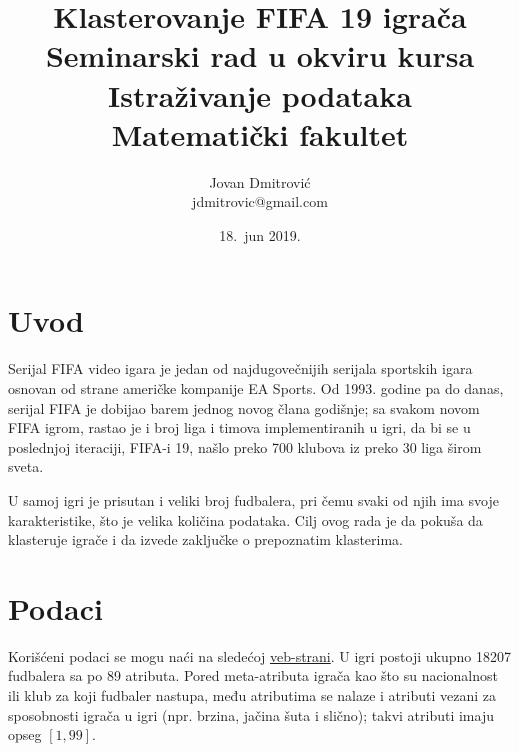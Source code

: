 \documentclass[a4paper]{article}
\begin{document}
\title{Klasterovanje FIFA 19 igrača\\ \small{Seminarski rad u okviru kursa\\Istraživanje podataka\\ Matematički fakultet}}

\author{Jovan Dmitrović\\ jdmitrovic@gmail.com}

\date{18.~jun 2019.}

\maketitle


\tableofcontents

\newpage

\section{Uvod}
\label{sec:uvod}

Serijal FIFA video igara je jedan od najdugovečnijih serijala sportskih igara osnovan od strane američke kompanije EA Sports. Od 1993. godine pa do danas, serijal FIFA je dobijao barem jednog novog člana godišnje; sa svakom novom FIFA igrom, rastao je i broj liga i timova implementiranih u igri, da bi se u poslednjoj iteraciji, FIFA-i 19, našlo preko 700 klubova iz preko 30 liga širom sveta.

U samoj igri je prisutan i veliki broj fudbalera, pri čemu svaki od njih ima svoje karakteristike, što je velika količina podataka. Cilj ovog rada je da pokuša da klasteruje igrače i da izvede zaključke o prepoznatim klasterima.

\section{Podaci}
\label{sec:podaci}

Korišćeni podaci se mogu naći na sledećoj \href{https://www.kaggle.com/karangadiya/fifa19}{veb-strani}. U igri postoji ukupno 18207 fudbalera sa po 89 atributa. Pored meta-atributa igrača kao što su nacionalnost ili klub za koji fudbaler nastupa, među atributima se nalaze i atributi vezani za sposobnosti igrača u igri (npr. brzina, jačina šuta i slično); takvi atributi imaju opseg $[1, 99]$.
\end{document}
